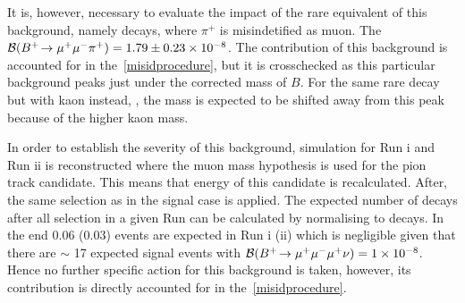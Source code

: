 It is, however, necessary to evaluate the impact of the rare equivalent of this background, namely \bmumupi decays, where $\pi^{+}$ is misindetified as muon. The $\mathcal{B}({{{B}^+}}\!\rightarrow {\ensuremath{\mu^+\mu^-}}{\ensuremath{{\pi}^+}})=1.79\pm0.23\times 10^{-8}$\cite{Patrignani:2016xqp}. The contribution of this background is accounted for in the~\autoref{misidprocedure}, but it is crosschecked as this particular background peaks just under the corrected mass of $B$. For the same rare decay but with kaon instead, \bmumuk, the mass is expected to be shifted away from this peak because of the higher kaon mass.

In order to establish the severity of this background, \bmumupi simulation for Run \Rn{1} and Run \Rn{2} is reconstructed where the muon mass hypothesis is used for the pion track candidate. This means that energy of this candidate is recalculated. After, the same selection as in the signal case is applied. The expected number of \bmumupi decays after all selection in a given Run can be calculated by normalising to \bjpsimumuk decays. In the end 0.06 (0.03) \bmumupi events are expected in Run \Rn{1} (\Rn{2}) which is negligible given that there are $\sim$ 17 expected signal events with $\mathcal{B}({{{B}^+}}\!\rightarrow {\ensuremath{\mu^+\mu^-\mu^+}}\nu)=1\times 10^{-8}$. Hence no further specific action for this background is taken, however, its contribution is directly accounted for in the~\autoref{misidprocedure}.





